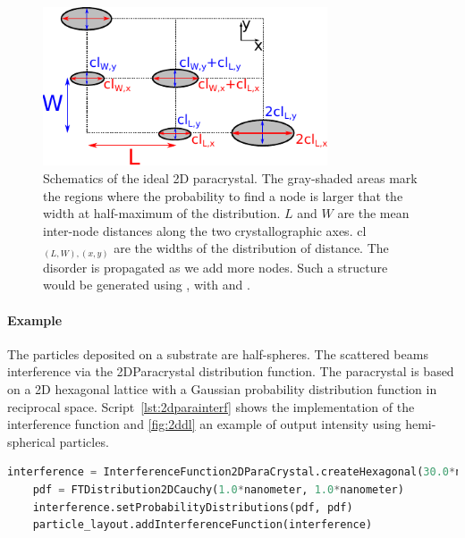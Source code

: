 \begin{figure}[tb]
\begin{center}
\includegraphics[width=0.75\textwidth]{fig/drawing/drawing2Dparacrystal.pdf}
\end{center}
\caption{Schematics of the ideal 2D paracrystal. The gray-shaded areas mark the regions where the probability to find a node is larger that the width at half-maximum of the distribution. $L$ and  $W$ are the mean inter-node distances along the two crystallographic axes. cl$_{(L,W),(x,y)}$ are the widths of the distribution of distance. The disorder is propagated as we add more nodes. Such a structure would be generated using , with  and  .}
\label{fig:2dparaschematic}
\end{figure}


\paragraph{Example} The particles deposited on a substrate are half-spheres. The scattered beams interference via the 2DParacrystal distribution function. The paracrystal is based on a 2D hexagonal lattice with a Gaussian probability distribution function in reciprocal space.  Script~\ref{lst:2dparainterf} shows the implementation of the interference function and \cref{fig:2ddl} an example of output intensity using hemi-spherical particles.

\begin{lstlisting}[language=python, style=eclipseboxed,numbers=none,nolol,caption={\Code{Python} script to define a "2DParacrystal" interference function between particles forming an hexagonal monolayer. },label={lst:2dparainterf}]
    interference = InterferenceFunction2DParaCrystal.createHexagonal(30.0*nanometer,0.0, 40.0*micrometer, 40.0*micrometer)|
    pdf = FTDistribution2DCauchy(1.0*nanometer, 1.0*nanometer)
    interference.setProbabilityDistributions(pdf, pdf)
    particle_layout.addInterferenceFunction(interference)
\end{lstlisting}

